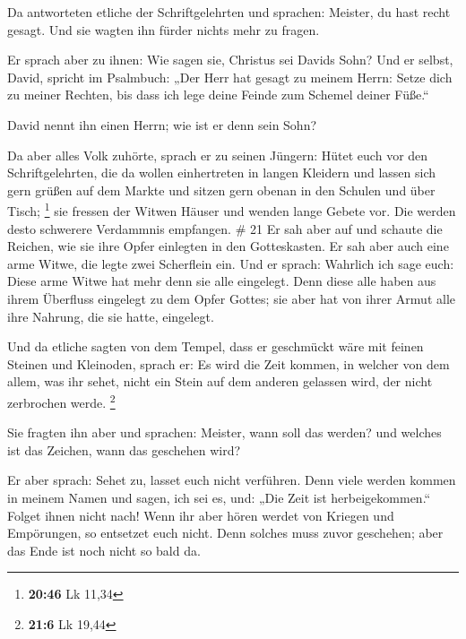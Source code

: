  Da antworteten etliche der Schriftgelehrten und
sprachen: Meister, du hast recht gesagt.  Und sie wagten
ihn fürder nichts mehr zu fragen.

 Er sprach aber zu ihnen: Wie sagen sie, Christus sei
Davids Sohn?  Und er selbst, David, spricht im Psalmbuch:
„Der Herr hat gesagt zu meinem Herrn: Setze dich zu meiner Rechten,
 bis dass ich lege deine Feinde zum Schemel deiner
Füße.``

 David nennt ihn einen Herrn; wie ist er denn sein Sohn?

 Da aber alles Volk zuhörte, sprach er zu seinen Jüngern:
 Hütet euch vor den Schriftgelehrten, die da wollen
einhertreten in langen Kleidern und lassen sich gern grüßen auf dem
Markte und sitzen gern obenan in den Schulen und über Tisch; \footnote{\textbf{20:46}
  Lk 11,34}  sie fressen der Witwen Häuser und wenden
lange Gebete vor. Die werden desto schwerere Verdammnis empfangen. \# 21
 Er sah aber auf und schaute die Reichen, wie sie ihre
Opfer einlegten in den Gotteskasten.  Er sah aber auch
eine arme Witwe, die legte zwei Scherflein ein.  Und er
sprach: Wahrlich ich sage euch: Diese arme Witwe hat mehr denn sie alle
eingelegt.  Denn diese alle haben aus ihrem Überfluss
eingelegt zu dem Opfer Gottes; sie aber hat von ihrer Armut alle ihre
Nahrung, die sie hatte, eingelegt.

 Und da etliche sagten von dem Tempel, dass er geschmückt
wäre mit feinen Steinen und Kleinoden, sprach er:  Es wird
die Zeit kommen, in welcher von dem allem, was ihr sehet, nicht ein
Stein auf dem anderen gelassen wird, der nicht zerbrochen werde.
\footnote{\textbf{21:6} Lk 19,44}

 Sie fragten ihn aber und sprachen: Meister, wann soll das
werden? und welches ist das Zeichen, wann das geschehen wird?

 Er aber sprach: Sehet zu, lasset euch nicht verführen.
Denn viele werden kommen in meinem Namen und sagen, ich sei es, und:
„Die Zeit ist herbeigekommen.`` Folget ihnen nicht nach! 
Wenn ihr aber hören werdet von Kriegen und Empörungen, so entsetzet euch
nicht. Denn solches muss zuvor geschehen; aber das Ende ist noch nicht
so bald da.

